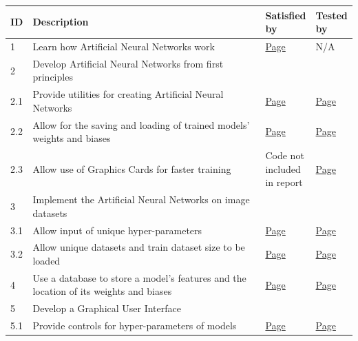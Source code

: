 \documentclass[./project-report/src/latex/project-report.tex]{subfiles}
\begin{document}
\noindent\begin{tabular}{|p{0.03\linewidth}|p{0.73\linewidth}|p{0.12\linewidth}|p{0.12\linewidth}|}
      \hline
      \textbf{ID} & \textbf{Description} & \textbf{Satisfied by} & \textbf{Tested by} \\
      \hline
      1 & Learn how Artificial Neural Networks work & \hyperref[sec:ann-theory]{Page \pageref{sec:ann-theory}} & N/A \\
      \hline
      2 & Develop Artificial Neural Networks from first principles & & \\
      \hline
      2.1 & Provide utilities for creating Artificial Neural Networks & \hyperref[sec:utils-subpackage]{Page \pageref{sec:utils-subpackage}} & \hyperref[sec:models-utils-unit-tests]{Page \pageref{sec:models-utils-unit-tests}} \\
      \hline
      2.2 & Allow for the saving and loading of trained models' weights and biases & \hyperref[sec:model-module]{Page \pageref{sec:model-module}} & \hyperref[sec:models-utils-unit-tests]{Page \pageref{sec:models-utils-unit-tests}} \\
      \hline
      2.3 & Allow use of Graphics Cards for faster training & Code not included in report & \hyperref[sec:cpu-vs-gpu-analysis]{Page \pageref{sec:cpu-vs-gpu-analysis}} \\
      \hline
      3 & Implement the Artificial Neural Networks on image datasets & & \\
      \hline
      3.1 & Allow input of unique hyper-parameters & \hyperref[sec:ann-implementations]{Page \pageref{sec:ann-implementations}} & \hyperref[sec:effects-of-hyper-parameters]{Page \pageref{sec:effects-of-hyper-parameters}} \\
      \hline
      3.2 & Allow unique datasets and train dataset size to be loaded & \hyperref[sec:ann-implementations]{Page \pageref{sec:ann-implementations}} & \hyperref[sec:train-dataset-size-analysis]{Page \pageref{sec:train-dataset-size-analysis}} \\
      \hline
      4 & Use a database to store a model's features and the location of its weights and biases & \hyperref[sec:__main__-module]{Page \pageref{sec:__main__-module}} & \hyperref[sec:database-unit-tests]{Page \pageref{sec:database-unit-tests}} \\
      \hline
      5 & Develop a Graphical User Interface & & \\
      \hline
      5.1 & Provide controls for hyper-parameters of models & \hyperref[sec:create_model-module]{Page \pageref{sec:create_model-module}} & \hyperref[sec:hyper-parameter-frame-input-validation]{Page \pageref{sec:hyper-parameter-frame-input-validation}} \\  %

\end{tabular}
\end{document}
